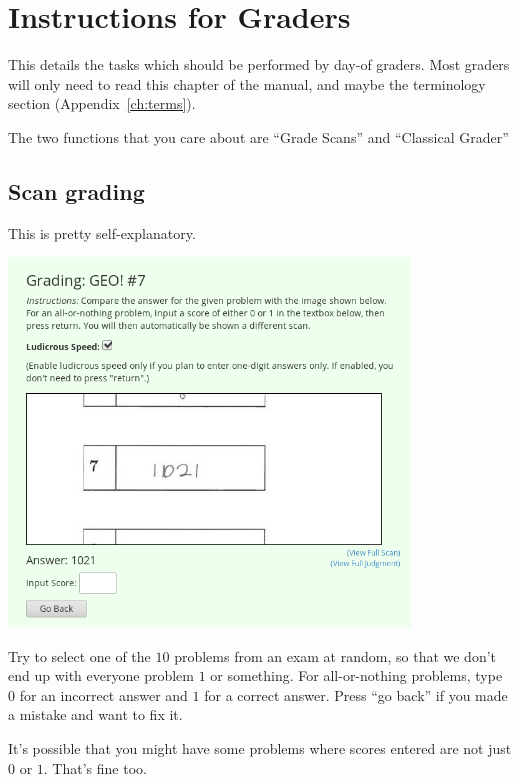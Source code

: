 \chapter{Instructions for Graders}
This details the tasks which should be performed by day-of graders.
Most graders will only need to read this chapter of the manual,
and maybe the terminology section (Appendix~\ref{ch:terms}).

The two functions that you care about are ``Grade Scans''
and ``Classical Grader''

\section{Scan grading}
This is pretty self-explanatory.

\begin{center}
	\includegraphics[width=0.8\textwidth]{images/scangrade.png}
\end{center}

\begin{itemize}
	\ii Try to select one of the $10$ problems from an exam at random,
	so that we don't end up with everyone problem $1$ or something.
	\ii For all-or-nothing problems,
	type $0$ for an incorrect answer and $1$ for a correct answer.
	\ii Press ``go back'' if you made a mistake and want to fix it.
\end{itemize}
It's possible that you might have some problems
where scores entered are not just $0$ or $1$.
That's fine too.

